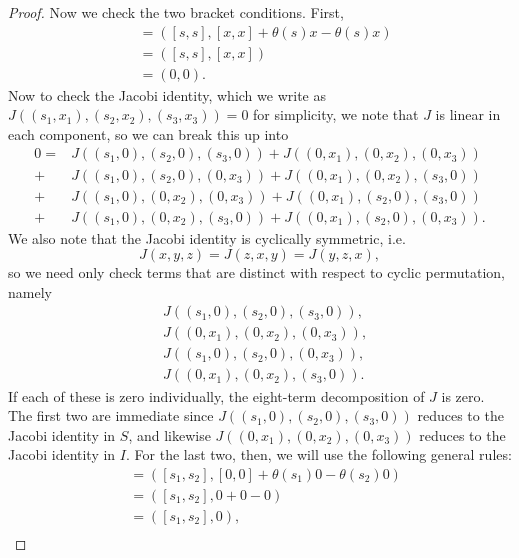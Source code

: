 \documentclass[12pt]{article}
\theoremstyle{definition}
\begin{document}
\begin{proof}
	Now we check the two bracket conditions.
	First, \begin{align*}
		[(s, x), (s, x)] & = ([s, s], [x, x] + \theta(s)x - \theta(s)x) \\
		                 & = ([s, s], [x, x])                           \\
		                 & = (0, 0).
	\end{align*}
	Now to check the Jacobi identity, which we write as $J((s_1, x_1), (s_2, x_2), (s_3, x_3)) = 0$ for simplicity, we note that $J$ is linear in each component, so we can break this up into \begin{align*}
		0 = & J((s_1, 0), (s_2, 0), (s_3, 0)) + J((0, x_1), (0, x_2), (0, x_3))  \\
		+   & J((s_1, 0), (s_2, 0), (0, x_3)) + J((0, x_1), (0, x_2), (s_3, 0))  \\
		+   & J((s_1, 0), (0, x_2), (0, x_3)) + J((0, x_1), (s_2, 0), (s_3, 0))  \\
		+   & J((s_1, 0), (0, x_2), (s_3, 0)) + J((0, x_1), (s_2, 0), (0, x_3)).
	\end{align*}
	We also note that the Jacobi identity is cyclically symmetric, i.e. \begin{equation*}
		J(x, y, z) = J(z, x, y) = J(y, z, x),
	\end{equation*}
	so we need only check terms that are distinct with respect to cyclic permutation, namely\begin{align*}
		 & J((s_1, 0), (s_2, 0), (s_3, 0)), \\
		 & J((0, x_1), (0, x_2), (0, x_3)), \\
		 & J((s_1, 0), (s_2, 0), (0, x_3)), \\
		 & J((0, x_1), (0, x_2), (s_3, 0)).
	\end{align*}
	If each of these is zero individually, the eight-term decomposition of $J$ is zero.
	The first two are immediate since $J((s_1, 0), (s_2, 0), (s_3, 0))$ reduces to the Jacobi identity in $S$, and likewise $J((0, x_1), (0, x_2), (0, x_3))$ reduces to the Jacobi identity in $I$.
	For the last two, then, we will use the following general rules: \begin{align*}
		[(s_1, 0), (s_2, 0)] & = ([s_1, s_2], [0, 0] + \theta(s_1)0 - \theta(s_2)0) \\
		                     & = ([s_1, s_2], 0 + 0 - 0)                            \\
		                     & = ([s_1, s_2], 0),                                   \\

\end{align*}
\end{proof}
\end{document}
